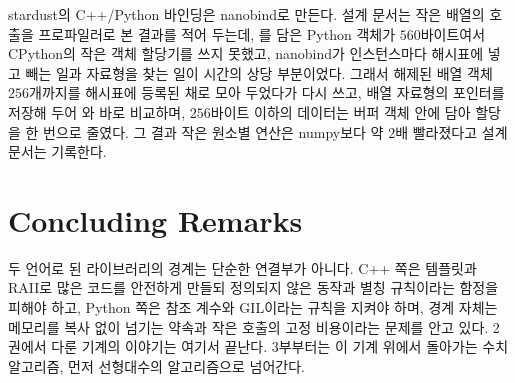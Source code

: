 \begin{instardust}
stardust의 C++/Python 바인딩은 nanobind로 만든다\cite{nanobind}. 설계 문서는 작은 배열의 호출을 프로파일러로 본 결과를 적어 두는데, 를 담은 Python 객체가 $560$바이트여서 CPython의 작은 객체 할당기를 쓰지 못했고, nanobind가 인스턴스마다 해시표에 넣고 빼는 일과 자료형을 찾는 일이 시간의 상당 부분이었다. 그래서 해제된 배열 객체 $256$개까지를 해시표에 등록된 채로 모아 두었다가 다시 쓰고, 배열 자료형의 포인터를 저장해 두어 와 바로 비교하며, $256$바이트 이하의 데이터는 버퍼 객체 안에 담아 할당을 한 번으로 줄였다. 그 결과 작은 원소별 연산은 numpy보다 약 $2$배 빨라졌다고 설계 문서는 기록한다.
\end{instardust}

\section{Concluding Remarks}

두 언어로 된 라이브러리의 경계는 단순한 연결부가 아니다. C++ 쪽은 템플릿과 RAII로 많은 코드를 안전하게 만들되 정의되지 않은 동작과 별칭 규칙이라는 함정을 피해야 하고, Python 쪽은 참조 계수와 GIL이라는 규칙을 지켜야 하며, 경계 자체는 메모리를 복사 없이 넘기는 약속과 작은 호출의 고정 비용이라는 문제를 안고 있다. 2권에서 다룬 기계의 이야기는 여기서 끝난다. 3부부터는 이 기계 위에서 돌아가는 수치 알고리즘, 먼저 선형대수의 알고리즘으로 넘어간다.

\chapterreferences
